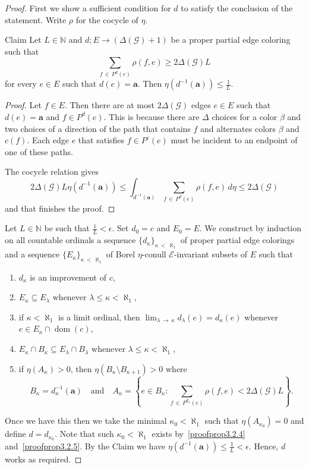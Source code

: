 \documentclass[AHL,Unicode,longabstracts,published]{cedram}
\DeclareMathOperator{\dom}{dom}
\newcommand{\bfa}{\mathbf{a}}
\newcommand{\clG}{\mathcal{G}}
\newcommand{\clE}{\mathcal{E}}
\newcommand{\bbZ}{\mathbb{N}}
\newcommand{\clG}{\mathcal{G}}
\begin{document}
\begin{proof}
First we show a sufficient condition for $d$ to satisfy the conclusion of the statement. Write $\rho$ for the cocycle of $\eta$.

\begin{enonce*}{Claim }
Let $L\in \bbZ$ and $d;E\to (\Delta(\clG)+1)$ be a proper partial edge coloring such that
\[
\sum_{f\,\in\,P^d(e)}\rho(f,e)\ge 2\Delta(\clG) L
\]
for every $e\in E$ such that $d(e)=\bfa$. Then $\eta(d^{-1}(\bfa))\le \frac{1}{L}$.
\end{enonce*}


\begin{proof}
Let $f\in E$. Then there are at most $2\Delta(\clG)$ edges $e\in E$ such that $d(e)=\bfa$ and $f\in P^d(e)$. This is because there are $\Delta$ choices for a color $\beta$ and two choices of a direction of the path that contains $f$ and alternates colors $\beta$ and $c(f)$. Each edge $e$ that satisfies $f\in P^c(e)$ must be incident to an endpoint of one of these paths.

The cocycle relation gives
\[
2\Delta(\clG) L\eta\left(d^{-1}(\bfa)\right) \le \int_{d^{-1}(\bfa)} \sum_{f\,\in\,P^d(e)}\rho(f,e) \, d\eta\le 2\Delta(\clG)
\]
and that finishes the proof.
\end{proof}

Let $L\in \bbZ$ be such that $\tfrac{1}{L}<\epsilon$. Set $d_0=c$ and $E_0=E$. We construct by induction on all countable ordinals a sequence $\{d_{\kappa}\}_{\kappa\,<\,\aleph_1}$ of proper partial edge colorings and a sequence $\{E_\kappa\}_{\kappa\,<\,\aleph_1}$ of Borel $\eta$-conull $\clE$-invariant subsets of $E$ such that
\begin{enumerate}
\item\label{proofprop3.2.1} $d_\kappa$ is an improvement of $c$,
\item\label{proofprop3.2.2} $E_\kappa \subseteq E_\lambda$ whenever $\lambda\le \kappa<\aleph_1$,
\item\label{proofprop3.2.3} if $\kappa<\aleph_1$ is a limit ordinal, then $\lim_{\lambda\,\to\,\kappa} d_\lambda(e)=d_\kappa(e)$ whenever $e\in E_\kappa\cap \dom(c)$,
\item\label{proofprop3.2.4} $E_\kappa\cap B_\kappa\subseteq E_\lambda \cap B_\lambda$ whenever $\lambda\le \kappa<\aleph_1$,
\item\label{proofprop3.2.5} if $\eta(A_\kappa)>0$, then $\eta(B_{\kappa}\setminus B_{\kappa+1})>0$
where 
\[
B_{\kappa}=d_\kappa^{-1}(\bfa)\quad \text{and} \quad A_{\kappa}=\left\{e\in B_\kappa:\sum_{f\,\in\,P^{d_\kappa}(e)}\rho(f,e)<2\Delta(\clG) L\right\}.
\]
\end{enumerate}
Once we have this then we take the minimal $\kappa_0<\aleph_1$ such that $\eta(A_{\kappa_0})=0$ and define $d=d_{\kappa_0}$. Note that such $\kappa_0<\aleph_1$ exists by~\eqref{proofprop3.2.4} and~\eqref{proofprop3.2.5}. By the Claim we have $\eta(d^{-1}(\bfa))\le \tfrac{1}{L}<\epsilon$. Hence, $d$ works as required.


\end{proof}
\end{document}
